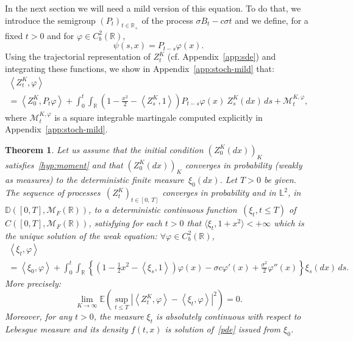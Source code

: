 \documentclass[10pt]{amsart}
\newtheorem{theo}{Theorem}[section]
\theoremstyle{definition}\newtheorem{defi}[theo]{Definition}\newtheorem{rema}[theo]{Remark}\newtheorem{exam}[theo]{Example}\newtheorem{exem}[theo]{Example}\newtheorem{nota}[theo]{Notation}
\newcommand{\Mo}{\mathcal{M}}
\newcommand*\D{\mathbb{D}}
\newcommand*\R{\mathbb{R}}
\newcommand*\E{\mathbb{E}}
\newcommand{\bbL}{\mathbb{L}}
\let\oldforall\forall
\renewcommand*{\forall}{\mathrel{\oldforall}}
\begin{document}
In the next section we will need a mild version of this equation. To do that, we introduce the semigroup $(P_{t})_{t \in \R_{+}}$ of the process $\sigma B_{t} - c \sigma t$ and we define, for a fixed $t>0$ and for $\varphi\in C^2_{b}(\R)$,
\begin{equation}\label{eq:semi-gp}
\psi(s,x) = P_{t-s}\varphi(x).
\end{equation}
Using the trajectorial representation of $Z^{K}_{t}$ (cf. Appendix~\ref{app:sde}) and integrating these functions, we show in Appendix~\ref{app:stoch-mild} that:
\begin{multline}\label{mild-proc}
\left\langle Z^{K}_{t},\varphi\right\rangle\\
=\left\langle Z^{K}_0,P_{t}\varphi\right\rangle+\int_{0}^{t} \int_{\R} \left(1-\frac{x^2}{2}-\left\langle Z^{K}_{s}, 1\right\rangle\right)P_{t-s}\varphi(x)\ Z^{K}_{s}(dx)\, ds+\Mo^{K, \varphi}_{t},
\end{multline}
where $\Mo^{K, \varphi}_{t}$ is a square integrable martingale computed explicitly in Appendix~\ref{app:stoch-mild}.

\begin{theo}\label{thm-CV}
Let us assume that the initial condition $(Z^K_0(dx))_{K}$ satisfies~\eqref{hyp:moment} and that $(Z^{K}_0(dx))_{K}$ converges in probability (weakly as measures) to the deterministic finite measure $\,\xi_0(dx)$. Let $T>0$ be given. The sequence of processes $\,(Z^{K}_{t})_{t \in [0,\,T]}$ converges in probability and in $\bbL^2$, in $\D([0,T],\Mo_{F}(\R))$, to a deterministic continuous function $\,(\xi_{t}, t\le T)$ of $C([0,T],\Mo_{F}(\R))$, satisfying for each $t>0$ that $\langle \xi_{t}, 1+x^2\rangle <+\infty$ which is the unique solution of the weak equation: $\forall \varphi\in C^2_{b}(\R)$,
\begin{multline}\label{limit-moving}
\left\langle \xi_{t},\varphi\right\rangle\\
=\left\langle \xi_{0},\varphi\right\rangle+\int_{0}^{t} \int_{\R} \left\{\left(1-\frac{1}{2}x^2-\left\langle \xi_{s}, 1\right\rangle\right)\varphi(x)-\sigma c \varphi'(x)+\frac{\sigma^2}{2}\varphi''(x)\right\} \xi_{s}(dx)\, ds.
\end{multline}
More precisely:
\begin{equation}\label{CV-L2}
\lim_{K \to \infty}\E\left(\sup_{t \le T} \left|\left\langle Z^{K}_{t},\varphi\right\rangle - \left\langle \xi_{t},\varphi\right\rangle\right|^2\right) = 0.
\end{equation}
Moreover, for any $t>0$, the measure $\xi_{t} $ is absolutely continuous with respect to Lebesgue measure and its density $f(t,x)$ is solution of~\eqref{pde} issued from $\xi_{0}$.
\end{theo}
\end{document}
